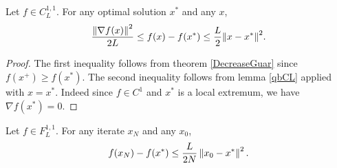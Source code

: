 \begin{lemma}
Let $f \in C_L^{1,1}$. For any optimal solution $x^*$ and any $x$,
\begin{equation*}
\frac{{\left\Vert \nabla f(x) \right\Vert}^2}{2L} \le f(x) - f(x^*) \le \frac{L}{2} {\left\Vert x-x^* \right\Vert}^2 .
\end{equation*}
\end{lemma}
\begin{proof}
The first inequality follows from theorem \ref{DecreaseGuar} since $f(x^+) \ge f(x^*)$. The second inequality follows from lemma \ref{qbCL} applied with $x = x^*$. Indeed since $f \in C^1$ and $x^*$ is a local extremum, we have $\nabla f(x^*) = 0$.
\end{proof}

\begin{theorem}
Let $f \in F_L^{1,1}$. For any iterate $x_N$ and any $x_0$,
\begin{equation*}
f(x_N) - f(x^*) \le \frac{L}{2N} \left\Vert x_0-x^* \right\Vert^2 .
\end{equation*}
\end{theorem}
